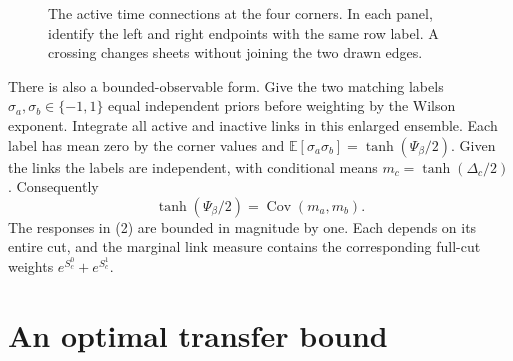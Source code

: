 \documentclass[11pt]{amsart}
\newcommand{\Cov}{\operatorname{Cov}}
\newcommand{\E}{\mathbb E}
\begin{document}
\begin{figure}[ht]
\centering
{}
\caption{The active time connections at the four corners. In each panel,
 identify the left and right endpoints with the same row label. A crossing
 changes sheets without joining the two drawn edges.}
\label{fig:seams}
\end{figure}

There is also a bounded-observable form. Give the two matching labels
\(\sigma_a,\sigma_b\in\{-1,1\}\) equal independent priors before weighting
by the Wilson exponent. Integrate all active and inactive links in this
enlarged ensemble. Each label has mean zero by the corner values and
\(\E[\sigma_a\sigma_b]=\tanh(\Psi_\beta/2)\).
Given the links the labels are independent, with conditional means
\(m_c=\tanh(\Delta_c/2)\). Consequently
\[
 \tanh(\Psi_\beta/2)=\Cov(m_a,m_b).                         \tag{2}
\]
The responses in (2) are bounded in magnitude by one. Each depends on its
entire cut, and the marginal link measure contains the corresponding
full-cut weights \(e^{S_c^0}+e^{S_c^1}\).

\section{An optimal transfer bound}
\end{document}
